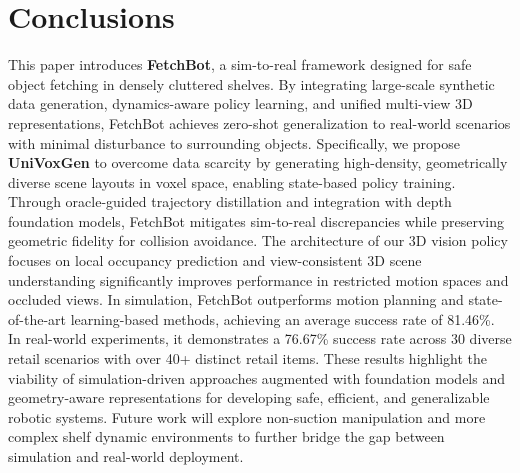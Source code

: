 \section{Conclusions}
This paper introduces \textbf{FetchBot}, a sim-to-real framework designed for safe object fetching in densely cluttered shelves. By integrating large-scale synthetic data generation, dynamics-aware policy learning, and unified multi-view 3D representations, FetchBot achieves zero-shot generalization to real-world scenarios with minimal disturbance to surrounding objects. Specifically, we propose \textbf{UniVoxGen} to overcome data scarcity by generating high-density, geometrically diverse scene layouts in voxel space, enabling state-based policy training. Through oracle-guided trajectory distillation and integration with depth foundation models, FetchBot mitigates sim-to-real discrepancies while preserving geometric fidelity for collision avoidance. The architecture of our 3D vision policy focuses on local occupancy prediction and view-consistent 3D scene understanding significantly improves performance in restricted motion spaces and occluded views. In simulation, FetchBot outperforms motion planning and state-of-the-art learning-based methods, achieving an average success rate of 81.46\%. In real-world experiments, it demonstrates a 76.67\% success rate across 30 diverse retail scenarios with over 40+ distinct retail items. These results highlight the viability of simulation-driven approaches augmented with foundation models and geometry-aware representations for developing safe, efficient, and generalizable robotic systems. Future work will explore non-suction manipulation and more complex shelf dynamic environments to further bridge the gap between simulation and real-world deployment.
